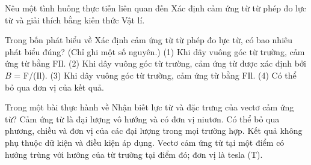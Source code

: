 \begin{bt}
Nêu một tình huống thực tiễn liên quan đến Xác định cảm ứng từ từ phép đo lực từ và giải thích bằng kiến thức Vật lí.
\end{bt}

\begin{ex}
Trong bốn phát biểu về Xác định cảm ứng từ từ phép đo lực từ, có bao nhiêu phát biểu đúng? (Chỉ ghi một số nguyên.) (1) Khi dây vuông góc từ trường, cảm ứng từ bằng FIl. (2) Khi dây vuông góc từ trường, cảm ứng từ được xác định bởi $B$ = F/(Il). (3) Khi dây vuông góc từ trường, cảm ứng từ bằng FIl. (4) Có thể bỏ qua đơn vị của kết quả.
\end{ex}

\begin{ex}
Trong một bài thực hành về Nhận biết lực từ và đặc trưng của vectơ cảm ứng từ?
\choice
{Cảm ứng từ là đại lượng vô hướng và có đơn vị niutơn.}
{Có thể bỏ qua phương, chiều và đơn vị của các đại lượng trong mọi trường hợp.}
{Kết quả không phụ thuộc dữ kiện và điều kiện áp dụng.}
{\True Vectơ cảm ứng từ tại một điểm có hướng trùng với hướng của từ trường tại điểm đó; đơn vị là tesla (T).}
\end{ex}

